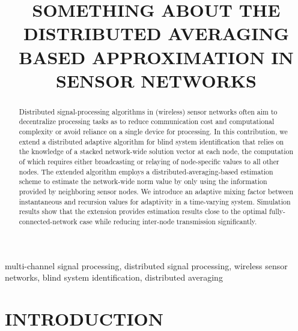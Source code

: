 \documentclass{article}
\title{SOMETHING ABOUT THE DISTRIBUTED AVERAGING BASED APPROXIMATION IN SENSOR NETWORKS}
\begin{document}
\ninept
%
\maketitle
%
\begin{abstract}
    Distributed signal-processing algorithms in (wireless) sensor networks often aim to decentralize processing tasks as to reduce communication cost and computational complexity or avoid reliance on a single device for processing.
    In this contribution, we extend a distributed adaptive algorithm for blind system identification that relies on the knowledge of a stacked network-wide solution vector at each node, the computation of which requires either broadcasting or relaying of node-specific values to all other nodes.
    The extended algorithm employs a distributed-averaging-based estimation scheme to estimate the network-wide norm value by only using the information provided by neighboring sensor nodes.
    We introduce an adaptive mixing factor between instantaneous and recursion values for adaptivity in a time-varying system.
    Simulation results show that the extension provides estimation results close to the optimal fully-connected-network case while reducing inter-node transmission significantly.
\end{abstract}
%
\begin{keywords}
multi-channel signal processing, distributed signal processing, wireless sensor networks, blind system identification, distributed averaging
\end{keywords}
%
\section{INTRODUCTION}
\label{sec:intro}
\end{document}
